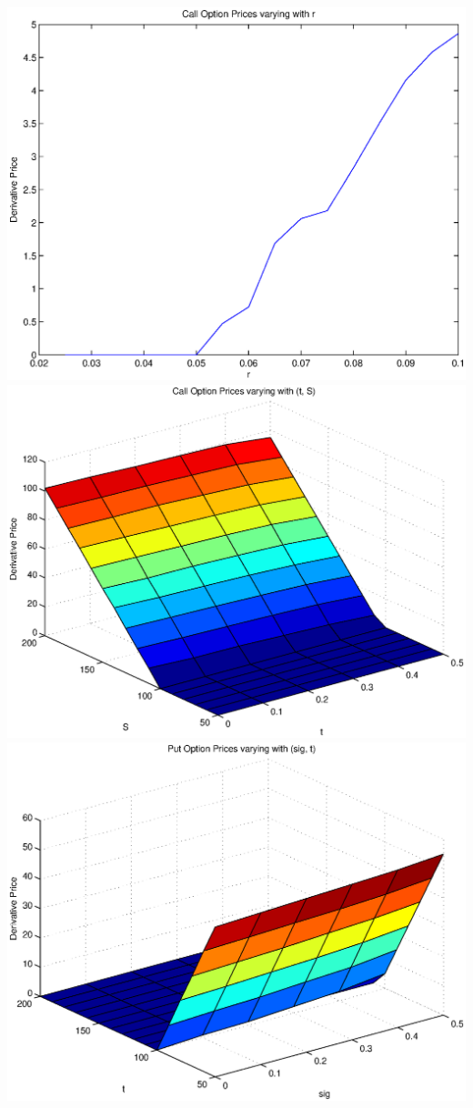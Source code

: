 \documentclass{article}
\begin{document}
\includegraphics[width=\textwidth]{Call_Option_Prices_varying_with_r}
\includegraphics[width=\textwidth]{Call_Option_Prices_varying_with_(t,_S)}
\includegraphics[width=\textwidth]{Put_Option_Prices_varying_with_(sig,_t)}
\end{document}
